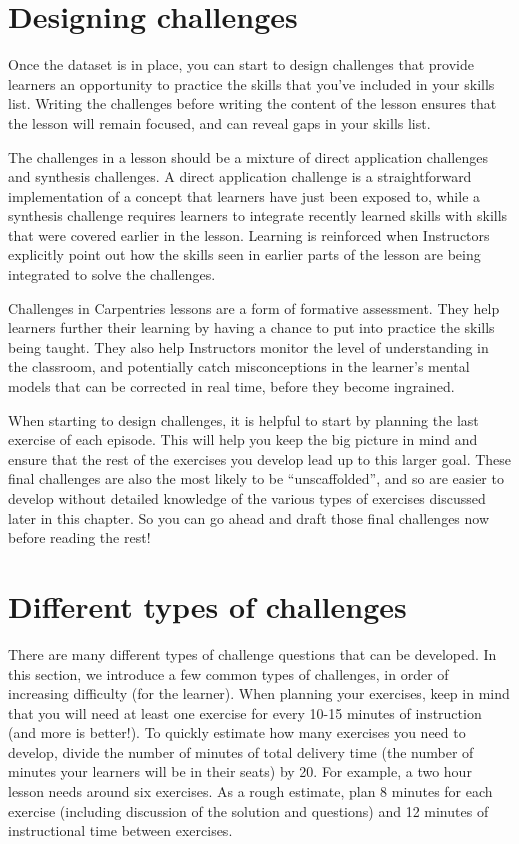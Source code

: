 \documentclass[
]{book}
\begin{document}
\hypertarget{designing-challenges-1}{%
\section{Designing challenges}\label{designing-challenges-1}}

Once the dataset is in place, you can start to
design challenges that provide learners an opportunity to practice the skills that you've
included in your skills list. Writing the challenges before writing the content of the lesson ensures that the
lesson will remain focused, and can reveal gaps in your skills list.

The challenges in a lesson should be a mixture of direct application challenges and synthesis
challenges. A direct application challenge is a straightforward implementation of a concept
that learners have just been exposed to, while a synthesis challenge requires learners to
integrate recently learned skills with skills that were covered earlier in
the lesson. Learning is reinforced when Instructors explicitly point out how the skills seen in
earlier parts of the lesson are being integrated to solve the challenges.

Challenges in Carpentries lessons are a form of formative assessment. They help learners further
their learning by having a chance to put into practice the skills being taught. They also help
Instructors monitor the level of understanding in the classroom, and potentially catch
misconceptions in the learner's mental models that can be corrected in real time, before they
become ingrained.

When starting to design challenges, it is helpful to start by planning the last exercise of each
episode. This will help you keep the big picture in mind and ensure that the rest of the
exercises you develop lead up to this larger goal. These final challenges are also
the most likely to be ``unscaffolded'', and so are easier to develop without detailed
knowledge of the various types of exercises discussed later in this chapter. So you
can go ahead and draft those final challenges now before reading the rest!

\hypertarget{different-types-of-challenges}{%
\section{Different types of challenges}\label{different-types-of-challenges}}

There are many different types of challenge questions that can be developed. In this
section, we introduce a few common types of challenges, in order of increasing
difficulty (for the learner). When planning your exercises, keep in mind that you will
need at least one exercise for every 10-15 minutes of instruction (and more is better!).
To quickly estimate how many exercises you need to develop, divide the number of
minutes of total delivery time (the number of minutes your learners will be in their
seats) by 20. For example, a two hour lesson needs around six exercises.
As a rough estimate, plan 8 minutes for each exercise
(including discussion of the solution and questions) and 12 minutes of instructional time
between exercises.
\end{document}
